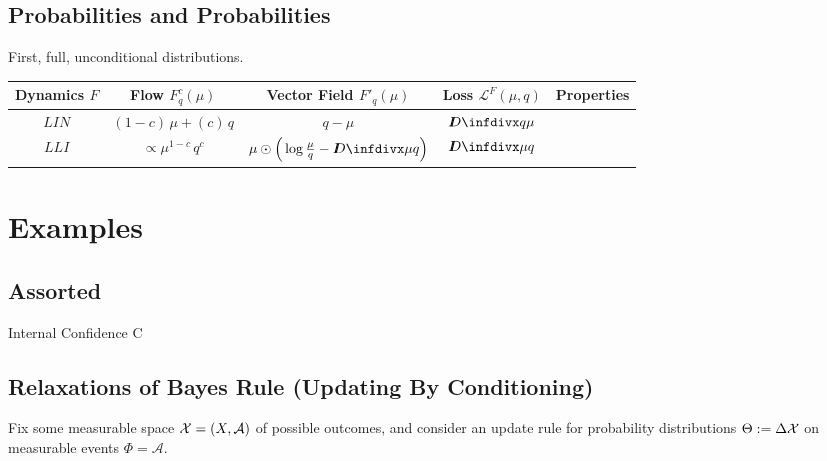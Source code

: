 \documentclass{article}
\begin{document}
\subsection{Probabilities and Probabilities}

First, full, unconditional distributions. 
\begin{center}
\begin{tabular}{c|ccc|c}\toprule
    Dynamics $F$ & Flow $F^c_q(\mu)$
        & Vector Field $F'_q(\mu)$
        & Loss $\mathcal L^{F}(\mu, q)$
        & Properties
        \\\midrule
    $\mathit{LIN}$
        & $%
            (1-c)\,\mu + (c)\, q$
        & $%
            q - \mu$
        & $%
            \kldiv{q}{\mu}$
        & \\ 
    $\mathit{LLI}$
        & $\propto
            \mu^{1-c}\, q^c$
        & $\mu \odot \Big( \log \frac\mu q - \kldiv\mu q \Big)$ 
        & $\kldiv\mu q$ 
        &\\
    \bottomrule
\end{tabular}
\end{center}


\section{Examples}
\subsection{Assorted}

\begin{examplex}{Internal Confidence}{}
	C
\end{examplex}

\subsection{Relaxations of Bayes Rule (Updating By Conditioning)}
Fix some measurable space $\mathcal X = (X, \mathcal A)$ of possible outcomes, and consider an update rule for probability distributions $\Theta := \Delta\mathcal X$
on measurable events $\Phi = \mathcal A$.
\end{document}
